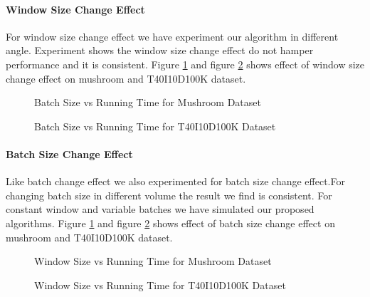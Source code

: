	\paragraph{Window Size Change Effect}For window size change effect we have experiment our algorithm in different angle. Experiment shows the window size change effect do not hamper performance and it is consistent. Figure \ref{result:g_m_const_batch} and figure \ref{result:g_t10_const_batch} shows effect of window size change effect on mushroom and T40I10D100K dataset.
		\begin{figure}[h]
		\centering
			
		\caption{Batch Size vs Running Time for Mushroom Dataset }
		\label{result:g_m_const_batch}
		\end{figure}
		\begin{figure}[h]
		\centering
			
		\caption{Batch Size vs Running Time for T40I10D100K Dataset }
		\label{result:g_t10_const_batch}
		\end{figure}
	\paragraph{Batch Size Change Effect}Like batch change effect we also experimented for batch size change effect.For changing batch size in different volume the result we find is consistent. For constant window and variable batches we have simulated our proposed algorithms. Figure \ref{result:g_m_const_batch} and figure \ref{result:g_t10_const_batch} shows effect of batch size change effect on mushroom and T40I10D100K dataset.
		\begin{figure}[h]
		\centering
			
		\caption{Window Size vs Running Time for Mushroom Dataset }
		\label{result:g_m_const_win}
		\end{figure}
		\begin{figure}[h]
		\centering
			
		\caption{Window Size vs Running Time for T40I10D100K Dataset }
		\label{result:g_t10_const_win}
		\end{figure}
\clearpage

